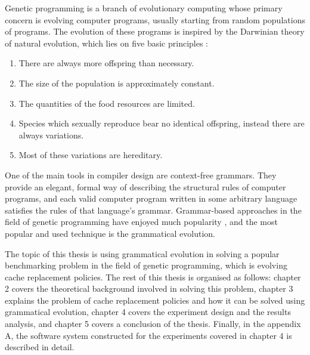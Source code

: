 Genetic programming is a branch of evolutionary computing whose primary concern is evolving computer programs, usually starting from random populations of programs. The evolution of these programs is inspired by the Darwinian theory of natural evolution, which lies on five basic principles \citep{cupic2019evolucijskoracunarstvo}:

\begin{enumerate}
	\item There are always more offspring than necessary.
	\item The size of the population is approximately constant.
	\item The quantities of the food resources are limited.
	\item Species which sexually reproduce bear no identical offspring, instead there are always variations.
	\item Most of these variations are hereditary.
\end{enumerate}

One of the main tools in compiler design are context-free grammars. They provide an elegant, formal way of describing the structural rules of computer programs, and each valid computer program written in some arbitrary language satisfies the rules of that language's grammar. Grammar-based approaches in the field of genetic programming have enjoyed much popularity \citep{neill2003grammaticalevolution}, and the most popular and used technique is the grammatical evolution.

The topic of this thesis is using grammatical evolution in solving a popular benchmarking problem in the field of genetic programming, which is evolving cache replacement policies. The rest of this thesis is organised as follows: chapter 2 covers the theoretical background involved in solving this problem, chapter 3 explains the problem of cache replacement policies and how it can be solved using grammatical evolution, chapter 4 covers the experiment design and the results analysis, and chapter 5 covers a conclusion of the thesis. Finally, in the appendix A, the software system constructed for the experiments covered in chapter 4 is described in detail.